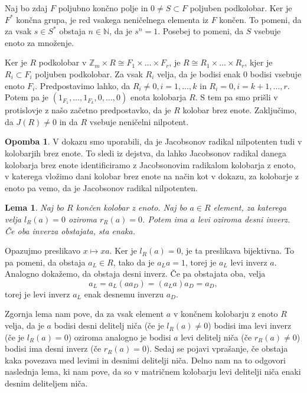 \documentclass[a4paper, 12pt]{amsart}
\theoremstyle{definition} %
\newtheorem{opomba}[definicija]{Opomba}
\theoremstyle{plain} %
\newtheorem{lema}[definicija]{Lema}
\newcommand{\N}{\mathbb N}
\newcommand{\Z}{\mathbb Z}
\begin{document}
Naj bo zdaj $F$ poljubno končno polje in $0\neq S\subset F$ poljuben podkolobar. Ker je $F^*$ končna grupa, je red vsakega neničelnega elementa iz $F$ končen. To pomeni, da za vsak $s\in S^*$ obstaja $n\in \N$, da je $s^n=1$. Posebej to pomeni, da $S$ vsebuje enoto za množenje. 

Ker je $R$ podkolobar v $\Z_m\times R \cong F_1 \times \dots\times F_r$, je $R\cong R_1\times \dots \times R_r$, kjer je $R_i\subset F_i$ poljuben podkolobar. Za vsak $R_i$ velja, da je bodisi enak 0 bodisi vsebuje enoto $F_i$. Predpostavimo lahko, da $R_i \neq 0, i = 1,\dots,k $ in $R_i = 0, i =k+1,\dots,r$. Potem pa je $(1_{F_1},\dots,1_{F_k},0,\dots,0)$ enota kolobarja $R$. S tem pa smo prišli v protislovje z našo začetno predpostavko, da je $R$ kolobar brez enote. Zaključimo, da $J(R)\neq 0$ in da $R$ vsebuje neničelni nilpotent. 

\endproof		

\begin{opomba}
V dokazu smo uporabili, da je Jacobsonov radikal nilpotenten tudi v kolobarjih brez enote. To sledi iz dejstva, da lahko Jacobsonov radikal danega kolobarja brez enote identificiramo z Jacobsonovim radikalom kolobarja z enoto, v katerega vložimo dani kolobar brez enote na način kot v dokazu, za kolobarje z enoto pa vemo, da je Jacobsonov radikal nilpotenten.
\end{opomba}

\begin{lema}
\label{inverz}
Naj bo $R$ končen kolobar z enoto. Naj bo $a\in R$ element, za katerega velja $l_R(a) = 0 $ oziroma $r_R(a)=0$. Potem ima $a$ levi oziroma desni inverz. Če oba inverza obstajata, sta enaka. 
\end{lema}

\proof
Opazujmo preslikavo $x \mapsto xa$. Ker je $l_R(a) = 0$, je ta preslikava bijektivna. To pa pomeni, da obstaja $a_L\in R$, tako da je $a_L a = 1$, torej je $a_L$ levi inverz $a$. Analogno dokažemo, da obstaja desni inverz. Če pa obstajata oba, velja
$$
a_L = a_L(aa_D) = (a_L a)a_D = a_D,
$$
torej je levi inverz $a_L$ enak desnemu inverzu $a_D$.
\endproof

Zgornja lema nam pove, da za vsak element $a$ v končnem kolobarju z enoto $R$ velja, da je $a$ bodisi desni delitelj niča (če je $l_R(a)\neq 0$) bodisi ima levi inverz (če je $l_R(a)=0$) oziroma analogno je bodisi $a$ levi delitelj niča (če $r_R(a) \neq 0$) bodisi ima desni inverz (če $r_R(a) = 0$). Sedaj se pojavi vprašanje, če obstaja kaka povezava med levimi in desnimi delitelji niča. Delno nam na to odgovori naslednja lema, ki nam pove, da so v matričnem kolobarju levi delitelji niča enaki desnim deliteljem niča.
\end{document}
